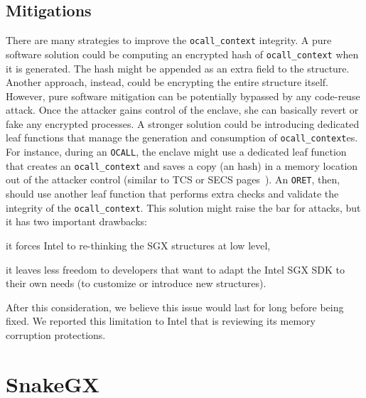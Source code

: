 \subsection{Mitigations}
\label{ssec:ocall-limitation}
There are many strategies to improve the \texttt{ocall\_context} integrity. 
A pure software solution could be computing an encrypted hash of 
\texttt{ocall\_context} when it is generated.
The hash might be appended as an extra field to the structure.
Another approach, instead, could be encrypting the entire structure itself.
However, pure software mitigation can be potentially bypassed by any 
code-reuse attack.
Once the attacker gains control of the enclave, she can basically revert or 
fake any encrypted processes.
A stronger solution could be introducing dedicated leaf functions that manage 
the generation and consumption of \texttt{ocall\_context}es.
For instance, during an \texttt{OCALL}, the enclave might use a dedicated leaf 
function that creates an \texttt{ocall\_context} and saves a 
copy (\ie an hash) in a memory location out of the attacker control (similar to 
TCS or SECS pages~\cite{costan2016intel}).
An \texttt{ORET}, then, should use another leaf function that performs extra 
checks and validate the integrity of the \texttt{ocall\_context}.
This solution might raise the bar for attacks, but it has two important 
drawbacks:
\begin{enumerate*}[label=(\roman*)]
	\item it forces Intel to re-thinking the SGX structures at low level,
	\item it leaves less freedom to developers that want to adapt the Intel SGX 
	SDK to their own needs (\eg to customize or introduce new structures).
\end{enumerate*}
After this consideration, we believe this issue would last for long before being
fixed. We reported this limitation to Intel that is reviewing its 
memory corruption protections.

\section{S\lowercase{nake}GX}
\label{sec:enclavekit}


